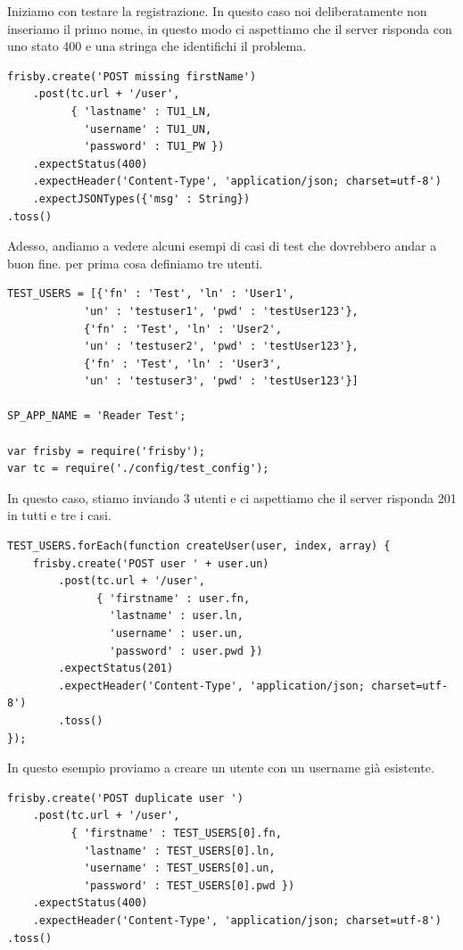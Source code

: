 Iniziamo con testare la registrazione. 
In questo caso noi deliberatamente non inseriamo il primo nome, in questo modo ci aspettiamo che il server risponda con uno stato 400 
e una stringa che identifichi il problema.

\begin{lstlisting}[caption={test/user/create\_accounts\_error\_spec.js}, style=javaScriptCode]
frisby.create('POST missing firstName')
    .post(tc.url + '/user',
          { 'lastname' : TU1_LN,
            'username' : TU1_UN,
            'password' : TU1_PW })
    .expectStatus(400)
    .expectHeader('Content-Type', 'application/json; charset=utf-8')
    .expectJSONTypes({'msg' : String})
.toss()
\end{lstlisting}

Adesso, andiamo a vedere alcuni esempi di casi di test che dovrebbero andar a buon fine. per prima cosa definiamo tre utenti.

\begin{lstlisting}[caption={test/user/create\_accounts\_spec.js}, style=javaScriptCode]
TEST_USERS = [{'fn' : 'Test', 'ln' : 'User1',
           	'un' : 'testuser1', 'pwd' : 'testUser123'},
          	{'fn' : 'Test', 'ln' : 'User2',
           	'un' : 'testuser2', 'pwd' : 'testUser123'},
          	{'fn' : 'Test', 'ln' : 'User3',
           	'un' : 'testuser3', 'pwd' : 'testUser123'}]

SP_APP_NAME = 'Reader Test';

var frisby = require('frisby');
var tc = require('./config/test_config');
\end{lstlisting}

In questo caso, stiamo inviando 3 utenti e ci aspettiamo che il server risponda 201 in tutti e tre i casi.

\begin{lstlisting}[caption={test/user/create\_accounts\_spec.js}, style=javaScriptCode]
TEST_USERS.forEach(function createUser(user, index, array) {
    frisby.create('POST user ' + user.un)
        .post(tc.url + '/user',
              { 'firstname' : user.fn,
                'lastname' : user.ln,
                'username' : user.un,
                'password' : user.pwd })
        .expectStatus(201)
        .expectHeader('Content-Type', 'application/json; charset=utf-8')
        .toss()
});
\end{lstlisting}

In questo esempio proviamo a creare un utente con un username già esistente.

\begin{lstlisting}[caption={test/user/create\_accounts\_spec.js}, style=javaScriptCode]
frisby.create('POST duplicate user ')
    .post(tc.url + '/user',
          { 'firstname' : TEST_USERS[0].fn,
            'lastname' : TEST_USERS[0].ln,
            'username' : TEST_USERS[0].un,
            'password' : TEST_USERS[0].pwd })
    .expectStatus(400)
    .expectHeader('Content-Type', 'application/json; charset=utf-8')
.toss()
\end{lstlisting}

